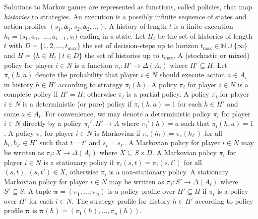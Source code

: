 \documentclass[10pt]{article}
\theoremstyle{plain}
\newcommand{\vect}[1]{\bm{#1}}
\begin{document}
Solutions to Markov games are represented as functions, called policies, that map \emph{histories} to strategies.
An execution is a possibly infinite sequence of states and action profiles $(s_{1}, \vect{a}_{1}, s_{2}, \vect{a}_{2}, \dots)$.
A history of length $t$ is a finite execution $h_{t} = (s_{1},a_{1},$ $\dots, a_{t-1}, s_{t})$ ending in a state.
Let $H_{t}$ be the set of histories of length $t$ with $D = \{ 1, 2, \dots, t_{\max} \}$ the set of decision-steps up to horizon $t_{\max} \in \mathbb{N} \cup \{ \infty \}$ and $H = \{ h \in H_{t} \mid t \in D \}$ the set of histories up to $t_{\max}$.
A (stochastic or mixed) policy for player $i \in N$ is a function $\pi_{i} : H' \to \Delta(A_{i})$ where $H' \subseteq H$.
Let $\pi_{i}(h, a)$ denote the probability that player $i \in N$ should execute action $a \in A_{i}$ in history $h \in H'$ according to strategy $\pi_{i}(h)$.
A policy $\pi_{i}$ for player $i \in N$ is a complete policy if $H' = H$, otherwise $\pi_{i}$ is a partial policy.
A policy $\pi_{i}$ for player $i \in N$ is a deterministic (or pure) policy if $\pi_{i}(h, a) = 1$ for each $h \in H'$ and some $a \in A_{i}$.
For convenience, we may denote a deterministic policy $\pi_{i}$ for player $i \in N$ directly by a policy $\pi_{i}' : H' \to A$ where $\pi_{i}'(h) = a$ such that $\pi_{i}(h, a) = 1$.
A policy $\pi_{i}$ for player $i \in N$ is Markovian if $\pi_{i}(h_{t}) = \pi_{i}(h_{t'})$ for all $h_{t}, h_{t'} \in H'$ such that $t = t'$ and $s_{t} = s_{t'}$.
A Markovian policy for player $i \in N$ may be written as $\pi_{i} : X \to \Delta(A_{i})$ where $X \subseteq S \times D$.
A Markovian policy $\pi_{i}$ for player $i \in N$ is a stationary policy if $\pi_{i}(s, t) = \pi_{i}(s, t')$ for all $(s, t), (s, t') \in X$, otherwise $\pi_{i}$ is a non-stationary policy.
A stationary Markovian policy for player $i \in N$ may be written as $\pi_{i} : S' \to \Delta(A_{i})$ where $S' \subseteq S$.
A tuple $\vect{\pi} = \left( \pi_{1}, \dots, \pi_{n} \right)$ is a policy profile over $H' \subseteq H$ if $\pi_{i}$ is a policy over $H'$ for each $i \in N$.
The strategy profile for history $h \in H'$ according to policy profile $\vect{\pi}$ is $\vect{\pi}(h) = \left( \pi_{1}(h), \dots, \pi_{n}(h) \right)$.
\end{document}
